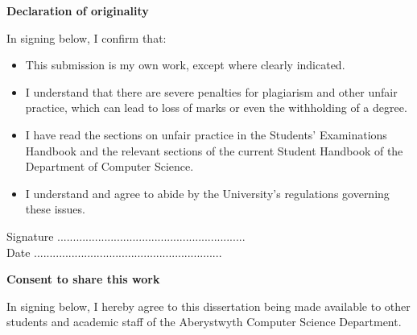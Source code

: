 \thispagestyle{empty}

\begin{center}
    {\LARGE\bf Declaration of originality}
\end{center}

In signing below, I confirm that:

\begin{itemize}
\item{This submission is my own work, except where clearly
indicated.  }

\item{I understand that there are severe penalties for plagiarism 
and other unfair practice, which can lead to loss of marks
or even the withholding of a degree. }
 
\item{I have read the sections on unfair practice in the Students' 
Examinations Handbook and the relevant sections of the 
current Student Handbook of the Department of Computer 
Science.}
 
\item{I understand and agree to abide by the University's
regulations governing these issues.}
\end{itemize}

\vspace{2em}
Signature ............................................................  \\

\vspace{1em}
Date ............................................................ \\

\vspace{1em}
\begin{center}
    {\LARGE\bf Consent to share this work}
\end{center}

In signing below, I hereby agree to this dissertation being made available to other
students and academic staff of the Aberystwyth Computer Science Department.  

